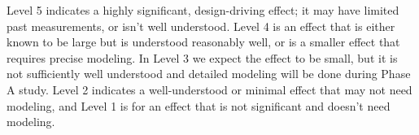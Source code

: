 \begin{table}[h!]
{Level 5 indicates a highly significant, design-driving effect; it may have limited past measurements, or isn't well understood.  Level 4 is an effect that is either known to be large but is understood reasonably well, or is a smaller effect that requires precise modeling.  In Level 3 we expect the effect to be small, but it is not sufficiently well understood and detailed modeling will be done during Phase A study. Level 2 indicates a well-understood or minimal effect that may not need modeling, and Level 1 is for an effect that is not significant and  doesn't need modeling. 
\label{tbl:SystematicsList2col} }
\hspace{-0.0in}
\vspace{-0.15in}
\end{table}
